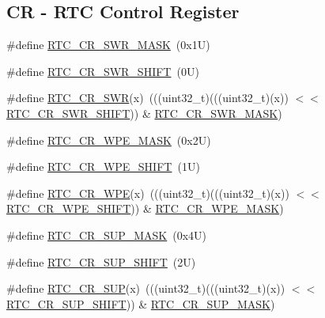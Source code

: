 \subsection*{CR -\/ R\+TC Control Register}
\begin{DoxyCompactItemize}
\item 
\#define \mbox{\hyperlink{group___r_t_c___register___masks_ga114a670a6ac2782bd777ea33e4395059}{R\+T\+C\+\_\+\+C\+R\+\_\+\+S\+W\+R\+\_\+\+M\+A\+SK}}~(0x1\+U)
\item 
\#define \mbox{\hyperlink{group___r_t_c___register___masks_gac0a88898cc6e1686b54a99e3a6fe759d}{R\+T\+C\+\_\+\+C\+R\+\_\+\+S\+W\+R\+\_\+\+S\+H\+I\+FT}}~(0\+U)
\item 
\#define \mbox{\hyperlink{group___r_t_c___register___masks_ga75b1e929441d00749e93c9d4b60e3740}{R\+T\+C\+\_\+\+C\+R\+\_\+\+S\+WR}}(x)~(((uint32\+\_\+t)(((uint32\+\_\+t)(x)) $<$$<$ \mbox{\hyperlink{group___r_t_c___register___masks_gac0a88898cc6e1686b54a99e3a6fe759d}{R\+T\+C\+\_\+\+C\+R\+\_\+\+S\+W\+R\+\_\+\+S\+H\+I\+FT}})) \& \mbox{\hyperlink{group___r_t_c___register___masks_ga114a670a6ac2782bd777ea33e4395059}{R\+T\+C\+\_\+\+C\+R\+\_\+\+S\+W\+R\+\_\+\+M\+A\+SK}})
\item 
\#define \mbox{\hyperlink{group___r_t_c___register___masks_gade2b0c86902f83d7674c10e3a7923f80}{R\+T\+C\+\_\+\+C\+R\+\_\+\+W\+P\+E\+\_\+\+M\+A\+SK}}~(0x2\+U)
\item 
\#define \mbox{\hyperlink{group___r_t_c___register___masks_ga319f4682f30aed777eecac4c09a96223}{R\+T\+C\+\_\+\+C\+R\+\_\+\+W\+P\+E\+\_\+\+S\+H\+I\+FT}}~(1\+U)
\item 
\#define \mbox{\hyperlink{group___r_t_c___register___masks_gaf4b3b342ecd1384206e26ccf17dc8e3c}{R\+T\+C\+\_\+\+C\+R\+\_\+\+W\+PE}}(x)~(((uint32\+\_\+t)(((uint32\+\_\+t)(x)) $<$$<$ \mbox{\hyperlink{group___r_t_c___register___masks_ga319f4682f30aed777eecac4c09a96223}{R\+T\+C\+\_\+\+C\+R\+\_\+\+W\+P\+E\+\_\+\+S\+H\+I\+FT}})) \& \mbox{\hyperlink{group___r_t_c___register___masks_gade2b0c86902f83d7674c10e3a7923f80}{R\+T\+C\+\_\+\+C\+R\+\_\+\+W\+P\+E\+\_\+\+M\+A\+SK}})
\item 
\#define \mbox{\hyperlink{group___r_t_c___register___masks_ga762afd0d0e0bbc08b631a10c45222797}{R\+T\+C\+\_\+\+C\+R\+\_\+\+S\+U\+P\+\_\+\+M\+A\+SK}}~(0x4\+U)
\item 
\#define \mbox{\hyperlink{group___r_t_c___register___masks_gacf42f5f0dc8f3939de4131b7b63d0dc2}{R\+T\+C\+\_\+\+C\+R\+\_\+\+S\+U\+P\+\_\+\+S\+H\+I\+FT}}~(2\+U)
\item 
\#define \mbox{\hyperlink{group___r_t_c___register___masks_ga77d71ad1346f9dce80d00209745c3d6a}{R\+T\+C\+\_\+\+C\+R\+\_\+\+S\+UP}}(x)~(((uint32\+\_\+t)(((uint32\+\_\+t)(x)) $<$$<$ \mbox{\hyperlink{group___r_t_c___register___masks_gacf42f5f0dc8f3939de4131b7b63d0dc2}{R\+T\+C\+\_\+\+C\+R\+\_\+\+S\+U\+P\+\_\+\+S\+H\+I\+FT}})) \& \mbox{\hyperlink{group___r_t_c___register___masks_ga762afd0d0e0bbc08b631a10c45222797}{R\+T\+C\+\_\+\+C\+R\+\_\+\+S\+U\+P\+\_\+\+M\+A\+SK}})
$$
\end{DoxyCompactItemize}
